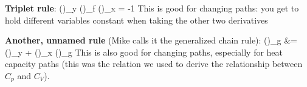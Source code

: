 \documentclass[12pt]{article}
\begin{document}
\textbf{Triplet rule}:
\eqs
\left(\right)_y \left(\right)_f \left(\right)_x = -1
\eqe
This is good for changing paths: you get to hold different variables constant when taking the other two derivatives

\textbf{Another, unnamed rule} (Mike calls it the generalized chain rule):
\eqs
\label{genChainRule}
\left(\right)_g &= \left(\right)_y + \left(\right)_x \cdot \left(\right)_g
\eqe
This is also good for changing paths, especially for heat capacity paths (this was the relation we used to derive the relationship between $C_p$ and $C_V$).
\end{document}
